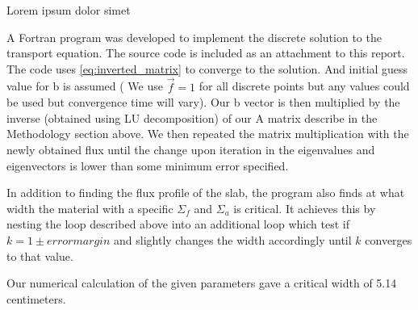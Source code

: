 \documentclass[../main.tex]{subfiles}
\begin{document}
Lorem ipsum dolor simet

A Fortran program was developed to implement the discrete solution to the transport equation. The source code is included as an attachment to this report. The code uses \eqref{eq:inverted_matrix} to converge to the solution. And initial guess value for b is assumed ( We use $\overrightarrow{f}=1$ for all discrete points but any values could be used but convergence time will vary). Our b vector is then multiplied by the inverse (obtained using LU decomposition) of our A matrix describe in the Methodology section above. We then repeated the matrix multiplication with the newly obtained flux until the change upon iteration in the eigenvalues and eigenvectors is lower than some minimum error specified.



In addition to finding the flux profile of the slab, the program also finds at what width the material with a specific $\Sigma_f$ and $\Sigma_a$ is critical. It achieves this by nesting the loop described above into an additional loop which test if $k = 1 \pm error margin$  and slightly changes the width accordingly until $k$ converges to that value. 

Our numerical calculation of the given parameters gave a critical width of 5.14 centimeters. 
	
\end{document}
